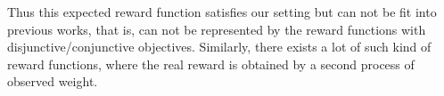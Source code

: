 \documentclass{article}
\begin{document}
Thus this expected reward function satisfies our setting but can not be fit into previous works, that is, can not be represented by the reward functions with disjunctive/conjunctive objectives. Similarly, there exists a lot of such kind of reward functions, where the real reward is obtained by a second process of observed weight.




\end{document}
